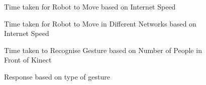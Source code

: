 \begin{figure}[H]
  \centering
  \caption{Time taken for Robot to Move based on Internet Speed}
  \label{Internet speed based performance}	
\end{figure}


\begin{figure}[H]
  \centering
  \caption{Time taken for Robot to Move in Different Networks based on Internet Speed}
  \label{Network based performance}	
\end{figure}

\begin{figure}[H]
  \centering
  \caption{Time taken to Recognise Gesture based on Number of People in Front of Kinect}
  \label{Kinect performance}	
\end{figure}


\begin{figure}[H]
  \centering
  \caption{Response based on type of gesture}
  \label{Gesture-action pair}	
\end{figure}


